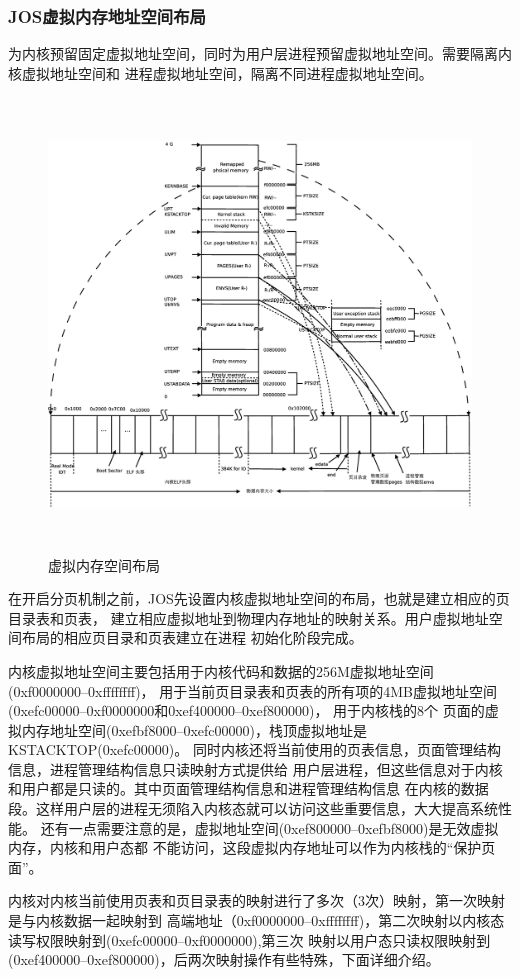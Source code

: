 \documentclass[12pt,openany,a4paper]{report}
\begin{document}
	    \subsubsection{JOS虚拟内存地址空间布局}
	    为内核预留固定虚拟地址空间，同时为用户层进程预留虚拟地址空间。需要隔离内核虚拟地址空间和
	进程虚拟地址空间，隔离不同进程虚拟地址空间。\par
	\begin{figure}[htb]
		\centering
		\includegraphics[height=12cm]{jos_layout.eps}
		\caption[虚拟内存空间布局]{虚拟内存空间布局}
	\end{figure}
	    在开启分页机制之前，JOS先设置内核虚拟地址空间的布局，也就是建立相应的页目录表和页表，
	建立相应虚拟地址到物理内存地址的映射关系。用户虚拟地址空间布局的相应页目录和页表建立在进程
	初始化阶段完成。\par
	    内核虚拟地址空间主要包括用于内核代码和数据的256M虚拟地址空间(0xf0000000--0xffffffff)，
	用于当前页目录表和页表的所有项的4MB虚拟地址空间(0xefc00000--0xf0000000和0xef400000--0xef800000)，
	用于内核栈的8个
	页面的虚拟内存地址空间(0xefbf8000--0xefc00000)，栈顶虚拟地址是KSTACKTOP(0xefc00000)。
	同时内核还将当前使用的页表信息，页面管理结构信息，进程管理结构信息只读映射方式提供给
	用户层进程，但这些信息对于内核和用户都是只读的。其中页面管理结构信息和进程管理结构信息
	在内核的数据段。这样用户层的进程无须陷入内核态就可以访问这些重要信息，大大提高系统性能。
	还有一点需要注意的是，虚拟地址空间(0xef800000--0xefbf8000)是无效虚拟内存，内核和用户态都
	不能访问，这段虚拟内存地址可以作为内核栈的“保护页面”。\par
	    内核对内核当前使用页表和页目录表的映射进行了多次（3次）映射，第一次映射是与内核数据一起映射到
	高端地址（0xf0000000--0xffffffff)，第二次映射以内核态读写权限映射到(0xefc00000--0xf0000000),第三次
	映射以用户态只读权限映射到(0xef400000--0xef800000)，后两次映射操作有些特殊，下面详细介绍。\par
	
\end{document}
